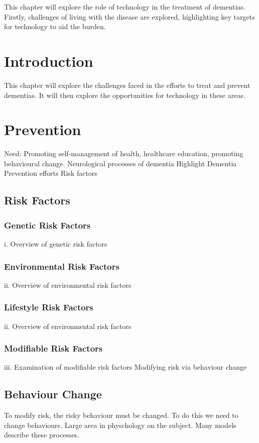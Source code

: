 This chapter will explore the role of technology in the treatment of dementias. Firstly, challenges of living with the disease are explored, highlighting key targets for technology to aid the burden. 

\section{Introduction}
This chapter will explore the challenges faced in the efforts to treat and prevent dementias. It will then explore the opportunities for technology in these areas. 

\section{Prevention}
Need: Promoting self-management of health, healthcare education, promoting behavioural change.
Neurological processes of dementia
Highlight Dementia Prevention efforts
Risk factors

\subsection{Risk Factors}
\subsubsection{Genetic Risk Factors}
i. Overview of genetic risk factors
\subsubsection{Environmental Risk Factors}
ii. Overview of environmental risk factors
\subsubsection{Lifestyle Risk Factors}
ii. Overview of environmental risk factors
\subsubsection{Modifiable Risk Factors}
iii. Examination of modifiable risk factors
Modifying risk via behaviour change

\subsection{Behaviour Change}
To modify risk, the risky behaviour must be changed. To do this we need to change behaviours. Large area in physchology on the subject. Many models describe these processes. 
